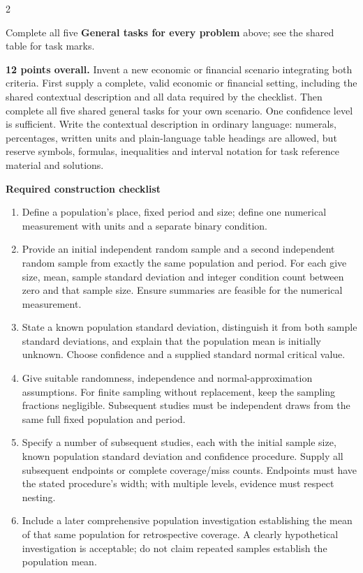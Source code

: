 \begin{multicols}{2}

\par\smallskip
Complete all five \textbf{General tasks for every problem} above; see the shared table for task marks.


\textbf{12 points overall.}
Invent a new economic or financial scenario integrating both criteria. First supply a complete, valid economic or financial setting, including the shared contextual description and all data required by the checklist. Then complete all five shared general tasks for your own scenario. One confidence level is sufficient. Write the contextual description in ordinary language: numerals, percentages, written units and plain-language table headings are allowed, but reserve symbols, formulas, inequalities and interval notation for task reference material and solutions.

\textbf{Required construction checklist}
\begin{enumerate}
\item Define a population's place, fixed period and size; define one numerical measurement with units and a separate binary condition.
\item Provide an initial independent random sample and a second independent random sample from exactly the same population and period. For each give size, mean, sample standard deviation and integer condition count between zero and that sample size. Ensure summaries are feasible for the numerical measurement.
\item State a known population standard deviation, distinguish it from both sample standard deviations, and explain that the population mean is initially unknown. Choose confidence and a supplied standard normal critical value.
\item Give suitable randomness, independence and normal-approximation assumptions. For finite sampling without replacement, keep the sampling fractions negligible. Subsequent studies must be independent draws from the same full fixed population and period.
\item Specify a number of subsequent studies, each with the initial sample size, known population standard deviation and confidence procedure. Supply all subsequent endpoints or complete coverage/miss counts. Endpoints must have the stated procedure's width; with multiple levels, evidence must respect nesting.
\item Include a later comprehensive population investigation establishing the mean of that same population for retrospective coverage. A clearly hypothetical investigation is acceptable; do not claim repeated samples establish the population mean.
\end{enumerate}


\end{multicols}
